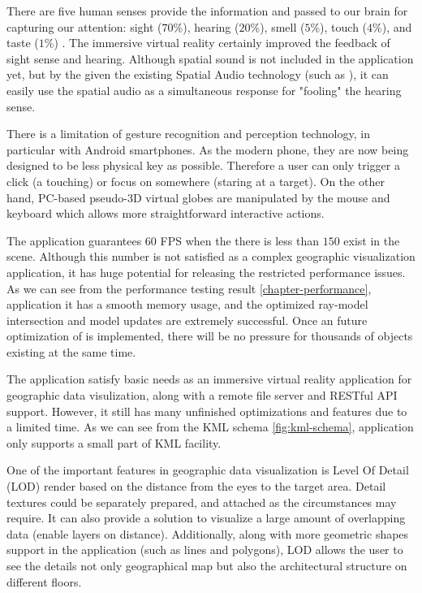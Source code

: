 There are five human senses provide the information and passed to our brain for capturing our attention: sight ($70$\%), hearing ($20$\%), smell ($5$\%), touch ($4$\%), and taste ($1$\%) \cite{mazuryk.vr.1996}. The immersive virtual reality certainly improved the feedback of sight sense and hearing. Although spatial sound is not included in the application yet, but by the given the existing Spatial Audio technology (such as \cite{google.spatial-audio.2016}), it can easily use the spatial audio as a simultaneous response for "fooling" the hearing sense.

There is a limitation of gesture recognition and perception technology, in particular with Android smartphones. As the modern phone, they are now being designed to be less physical key as possible. Therefore a user can only trigger a click (a touching) or focus on somewhere (staring at a target). On the other hand, PC-based pseudo-3D virtual globes are manipulated by the mouse and keyboard which allows more straightforward interactive actions.

The application guarantees $60$ FPS when the there is less than $150$  exist in the scene. Although this number is not satisfied as a complex geographic visualization application, it has huge potential for releasing the restricted performance issues. As we can see from the performance testing result \ref{chapter-performance}, application it has a smooth memory usage, and the optimized ray-model intersection and model updates are extremely successful. Once an future optimization of  is implemented, there will be no pressure for thousands of objects existing at the same time.

The application satisfy basic needs as an immersive virtual reality application for geographic data visulization, along with a remote file server and RESTful API support. However, it still has many unfinished optimizations and features due to a limited time. As we can see from the KML schema \ref{fig:kml-schema}, application only supports a small part of KML facility.

One of the important features in geographic data visualization is Level Of Detail (LOD) render based on the distance from the eyes to the target area. Detail textures could be separately prepared, and attached as the circumstances may require. It can also provide a solution to visualize a large amount of overlapping data (enable layers on distance). Additionally, along with more geometric shapes support in the application (such as lines and polygons), LOD allows the user to see the details not only geographical map but also the architectural structure on different floors.

